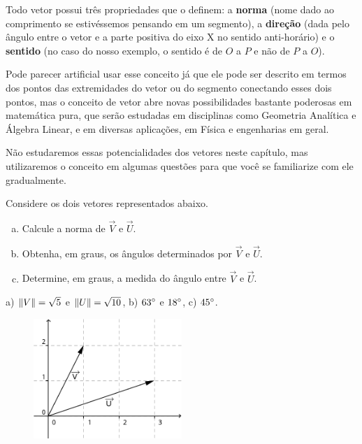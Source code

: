 \documentclass[main.tex]{subfiles}
\begin{document}
Todo vetor possui três propriedades que o definem: a \textbf{norma} (nome dado ao comprimento se estivéssemos pensando em um segmento), a \textbf{direção} (dada pelo ângulo entre o vetor e a parte positiva do eixo X no sentido anti-horário) e o \textbf{sentido} (no caso do nosso exemplo, o sentido é de $O$ a $P$ e não de $P$ a $O$).

Pode parecer artificial usar esse conceito já que ele pode ser descrito em termos dos pontos das extremidades do vetor ou do segmento conectando esses dois pontos, mas o conceito de vetor abre novas possibilidades bastante poderosas em matemática pura, que serão estudadas em disciplinas como Geometria Analítica e Álgebra Linear, e em diversas aplicações, em Física e engenharias em geral.

Não estudaremos essas potencialidades dos vetores neste capítulo, mas utilizaremos o conceito em algumas questões para que você se familiarize com ele gradualmente.

\begin{questao}
 Considere os dois vetores representados abaixo.
\begin{enumerate}[a)]
\item Calcule a norma de $\overrightarrow{V}$ e $\overrightarrow{U}$.
\item Obtenha, em graus, os ângulos determinados por $\overrightarrow{V}$ e $\overrightarrow{U}$.
\item Determine, em graus, a medida do ângulo entre $\overrightarrow{V}$ e $\overrightarrow{U}$.
\end{enumerate}
\end{questao}

\begin{gabarito}
	\begin{gabaritoQuestao}
		a) $\Arrowvert V \Arrowvert = \sqrt{5}$ e $\Arrowvert U \Arrowvert = \sqrt{10}$, b) $63\degree$ e $18\degree$, c) $45\degree$.
	\end{gabaritoQuestao}
\end{gabarito}


\begin{figure}[h]
\centering
\includegraphics[width=0.5\textwidth]{./img/c4q6.png}
\end{figure}
\end{document}
